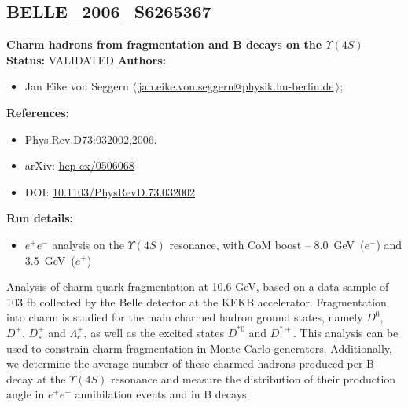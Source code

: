 \subsection{BELLE\_2006\_S6265367}
\textbf{Charm hadrons from fragmentation and B decays on the $\Upsilon(4S)$}\newline
\textbf{Status:} VALIDATED\newline
\textbf{Authors:}
\begin{itemize}
  \item Jan Eike von Seggern $\langle\,$\href{mailto:jan.eike.von.seggern@physik.hu-berlin.de}{jan.eike.von.seggern@physik.hu-berlin.de}$\,\rangle$;
\end{itemize}
\textbf{References:}
\begin{itemize}
  \item Phys.Rev.D73:032002,2006.
  \item arXiv: \href{http://arxiv.org/abs/hep-ex/0506068}{hep-ex/0506068}
  \item DOI: \href{http://dx.doi.org/10.1103/PhysRevD.73.032002}{10.1103/PhysRevD.73.032002}
\end{itemize}
\textbf{Run details:}
\begin{itemize}

  \item $e^+ e^-$ analysis on the $\Upsilon(4S)$ resonance, with CoM boost -- 8.0~GeV~($e^−$) and 3.5~GeV~($e^+$)\end{itemize}

\noindent Analysis of charm quark fragmentation at 10.6 GeV, based on a data sample of 103 fb collected by the Belle detector at the KEKB accelerator.  Fragmentation into charm is studied for the main charmed hadron ground states,  namely $D^0$, $D^+$, $D^+_s$ and $\Lambda_c^+$, as well as the excited states  $D^{*0}$ and $D^{*+}$. This analysis can be used to constrain charm fragmentation  in Monte Carlo generators. Additionally, we determine the average number of these charmed hadrons produced per B decay at the $\Upsilon(4S)$ resonance and measure the distribution of their production angle in $e^+ e^-$ annihilation  events and in B decays.

\clearpage


\clearpage

